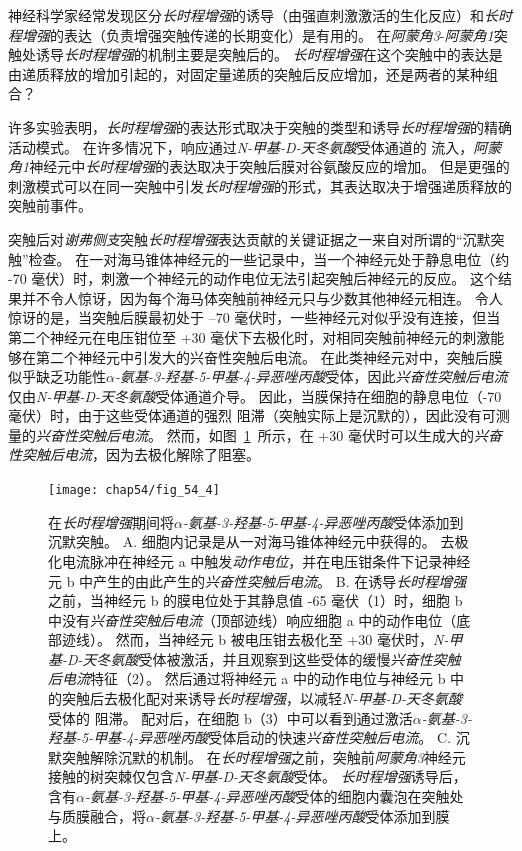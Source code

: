 神经科学家经常发现区分\textit{长时程增强}的诱导（由强直刺激激活的生化反应）和\textit{长时程增强}的表达（负责增强突触传递的长期变化）是有用的。
在\textit{阿蒙角3}-\textit{阿蒙角1}突触处诱导\textit{长时程增强}的机制主要是突触后的。
\textit{长时程增强}在这个突触中的表达是由递质释放的增加引起的，对固定量递质的突触后反应增加，还是两者的某种组合？


许多实验表明，\textit{长时程增强}的表达形式取决于突触的类型和诱导\textit{长时程增强}的精确活动模式。
在许多情况下，响应通过\textit{N-甲基-D-天冬氨酸}受体通道的  流入，\textit{阿蒙角1}神经元中\textit{长时程增强}的表达取决于突触后膜对谷氨酸反应的增加。
但是更强的刺激模式可以在同一突触中引发\textit{长时程增强}的形式，其表达取决于增强递质释放的突触前事件。


突触后对\textit{谢弗侧支}突触\textit{长时程增强}表达贡献的关键证据之一来自对所谓的“沉默突触”检查。
在一对海马锥体神经元的一些记录中，当一个神经元处于静息电位（约 -70 毫伏）时，刺激一个神经元的动作电位无法引起突触后神经元的反应。
这个结果并不令人惊讶，因为每个海马体突触前神经元只与少数其他神经元相连。
令人惊讶的是，当突触后膜最初处于 –70 毫伏时，一些神经元对似乎没有连接，但当第二个神经元在电压钳位至 +30 毫伏下去极化时，对相同突触前神经元的刺激能够在第二个神经元中引发大的兴奋性突触后电流。
在此类神经元对中，突触后膜似乎缺乏功能性\textit{$\alpha$-氨基-3-羟基-5-甲基-4-异恶唑丙酸}受体，因此\textit{兴奋性突触后电流}仅由\textit{N-甲基-D-天冬氨酸}受体通道介导。
因此，当膜保持在细胞的静息电位（-70 毫伏）时，由于这些受体通道的强烈  阻滞（突触实际上是沉默的），因此没有可测量的\textit{兴奋性突触后电流}。
然而，如图~\ref{fig:54_4}~所示，在 +30 毫伏时可以生成大的\textit{兴奋性突触后电流}，因为去极化解除了阻塞。


\begin{figure}[htbp]
	\centering
	\texttt{[image: chap54/fig\_54\_4]}
	\caption{在\textit{长时程增强}期间将\textit{$\alpha$-氨基-3-羟基-5-甲基-4-异恶唑丙酸}受体添加到沉默突触。
		A. 细胞内记录是从一对海马锥体神经元中获得的。
		去极化电流脉冲在神经元 a 中触发\textit{动作电位}，并在电压钳条件下记录神经元 b 中产生的由此产生的\textit{兴奋性突触后电流}。
		B. 在诱导\textit{长时程增强}之前，当神经元 b 的膜电位处于其静息值 -65 毫伏（1）时，细胞 b 中没有\textit{兴奋性突触后电流}（顶部迹线）响应细胞 a 中的动作电位（底部迹线）。
		然而，当神经元 b 被电压钳去极化至 +30 毫伏时，\textit{N-甲基-D-天冬氨酸}受体被激活，并且观察到这些受体的缓慢\textit{兴奋性突触后电流}特征（2）。
		然后通过将神经元 a 中的动作电位与神经元 b 中的突触后去极化配对来诱导\textit{长时程增强}，以减轻\textit{N-甲基-D-天冬氨酸}受体的  阻滞。
		配对后，在细胞 b（3）中可以看到通过激活\textit{$\alpha$-氨基-3-羟基-5-甲基-4-异恶唑丙酸}受体启动的快速\textit{兴奋性突触后电流}\cite{montgomery2001pair}。
		C. 沉默突触解除沉默的机制。
		在\textit{长时程增强}之前，突触前\textit{阿蒙角3}神经元接触的树突棘仅包含\textit{N-甲基-D-天冬氨酸}受体。
		\textit{长时程增强}诱导后，含有\textit{$\alpha$-氨基-3-羟基-5-甲基-4-异恶唑丙酸}受体的细胞内囊泡在突触处与质膜融合，将\textit{$\alpha$-氨基-3-羟基-5-甲基-4-异恶唑丙酸}受体添加到膜上。}
	\label{fig:54_4}
\end{figure}


